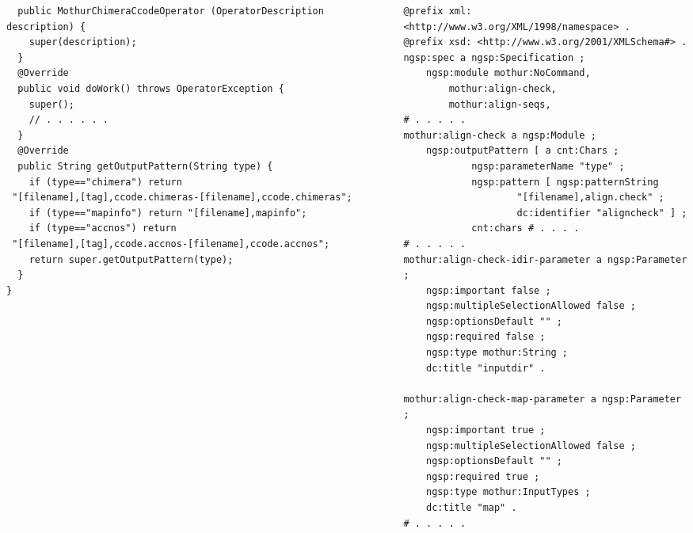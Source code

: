 \documentclass[10pt]{beamer}
\begin{document}
\begin{frame}[fragile]
\begin{columns}
\begin{column}{0.6\linewidth}
\begin{verbatim}
  public MothurChimeraCcodeOperator (OperatorDescription description) {
    super(description);
  }
  @Override
  public void doWork() throws OperatorException {
    super();
    // . . . . . .
  }
  @Override
  public String getOutputPattern(String type) {
    if (type=="chimera") return
 "[filename],[tag],ccode.chimeras-[filename],ccode.chimeras";
    if (type=="mapinfo") return "[filename],mapinfo";
    if (type=="accnos") return
 "[filename],[tag],ccode.accnos-[filename],ccode.accnos";
    return super.getOutputPattern(type);
  }
}
\end{verbatim}
    \end{column}
    \begin{column}{0.4\linewidth}
\begin{verbatim}
@prefix xml: <http://www.w3.org/XML/1998/namespace> .
@prefix xsd: <http://www.w3.org/2001/XMLSchema#> .
ngsp:spec a ngsp:Specification ;
    ngsp:module mothur:NoCommand,
        mothur:align-check,
        mothur:align-seqs,
# . . . . .
mothur:align-check a ngsp:Module ;
    ngsp:outputPattern [ a cnt:Chars ;
            ngsp:parameterName "type" ;
            ngsp:pattern [ ngsp:patternString
                    "[filename],align.check" ;
                    dc:identifier "aligncheck" ] ;
            cnt:chars # . . . .
# . . . . .
mothur:align-check-idir-parameter a ngsp:Parameter ;
    ngsp:important false ;
    ngsp:multipleSelectionAllowed false ;
    ngsp:optionsDefault "" ;
    ngsp:required false ;
    ngsp:type mothur:String ;
    dc:title "inputdir" .

mothur:align-check-map-parameter a ngsp:Parameter ;
    ngsp:important true ;
    ngsp:multipleSelectionAllowed false ;
    ngsp:optionsDefault "" ;
    ngsp:required true ;
    ngsp:type mothur:InputTypes ;
    dc:title "map" .
# . . . . .
\end{verbatim}
    \end{column}
  \end{columns}
\end{frame}
\end{document}
